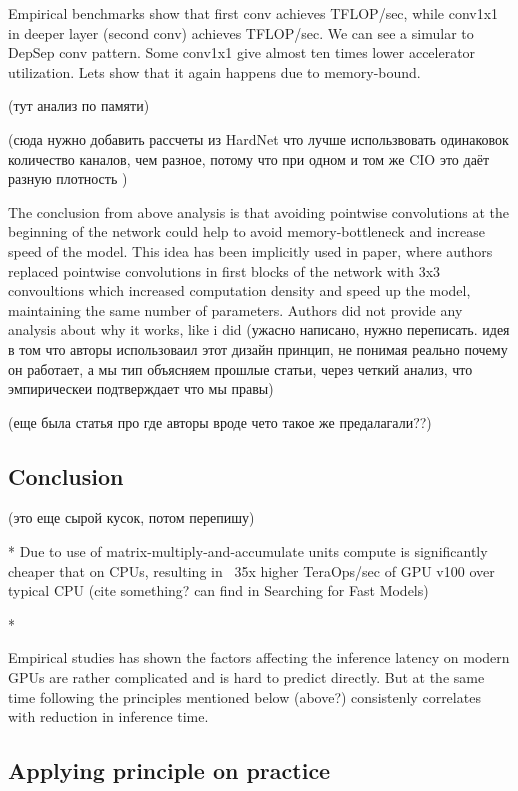 Empirical benchmarks show that first conv achieves  TFLOP/sec, while conv1x1 in deeper layer (second conv) achieves  TFLOP/sec. We can see a simular to DepSep conv pattern. Some conv1x1 give almost ten times lower accelerator utilization. Lets show that it again happens due to memory-bound.

(тут анализ по памяти)

(сюда нужно добавить рассчеты из HardNet что лучше использвовать одинаковок количество каналов, чем разное, потому что при одном и том же CIO это даёт разную плотность )

The conclusion from above analysis is that avoiding pointwise convolutions at the beginning of the network could help to avoid memory-bottleneck and increase speed of the model. This idea has been implicitly used in \cite{ridnik2021_tresnet} paper, where authors replaced pointwise convolutions in first blocks of the network with 3x3 convoultions which increased computation density and speed up the model, maintaining the same number of parameters. Authors did not provide any analysis about why it works, like i did (ужасно написано, нужно переписать. идея в том что авторы использоваил этот дизайн принцип, не понимая реально почему он работает, а мы тип объясняем прошлые статьи, через четкий анализ, что эмпирическеи подтверждает что мы правы)


(еще была статья про \cite{zhou2020_rethinking} где авторы вроде чето такое же предалагали??)

\subsection{Conclusion}


(это еще сырой кусок, потом перепишу)

* Due to use of matrix-multiply-and-accumulate units compute is significantly cheaper that on CPUs, resulting in ~35x higher TeraOps/sec of GPU v100 over typical CPU (cite something? can find in Searching for Fast Models)

* 

Empirical studies \cite{desing_spaces} has shown the factors affecting the inference latency on modern GPUs are rather complicated and is hard to predict directly. But at the same time following the principles mentioned below (above?) consistenly correlates with reduction in inference time. 
 

\subsection{Applying principle on practice}



